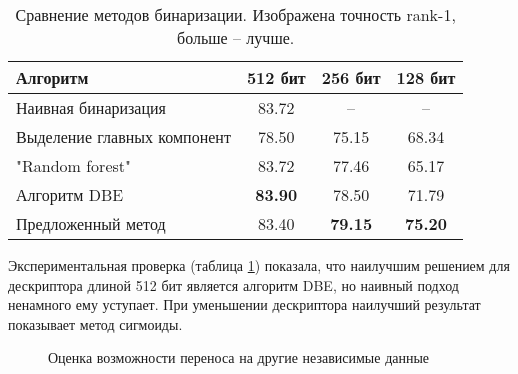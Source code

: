 \documentclass[a4paper]{article}
\begin{document}
\begin{multicols*}{2}
\begin{table}[H]\small
    \caption{Сравнение методов бинаризации. Изображена точность rank-1, больше -- лучше.}
    \label{comparebinarization}
    \centering\medskip%
    \begin{tabular}{ p{2.8cm} c c c } 
        \hline 
        Алгоритм & 512 бит & 256 бит & 128 бит \\
        \hline
        Наивная бинаризация & 83.72 & -- & -- \\
        Выделение главных компонент\cite{pca} & 78.50 & 75.15 & 68.34 \\
        "Random forest"\cite{randomforests} & 83.72 & 77.46 & 65.17 \\
        Алгоритм DBE\cite{dbe} & \textbf{83.90} & 78.50 & 71.79 \\
        Предложенный метод & 83.40 & \textbf{79.15} & \textbf{75.20} \\
        \hline
    \end{tabular}
\end{table}

Экспериментальная проверка (таблица \ref{comparebinarization}) показала, что наилучшим решением для дескриптора длиной 512 бит является алгоритм DBE, но наивный подход ненамного ему уступает. При уменьшении дескриптора наилучший результат показывает метод сигмоиды.

\begin{figure}[H]
    \caption{Оценка возможности переноса на другие независимые данные}
    \label{comparetransit}
\end{figure}


\end{multicols*}
\end{document}
